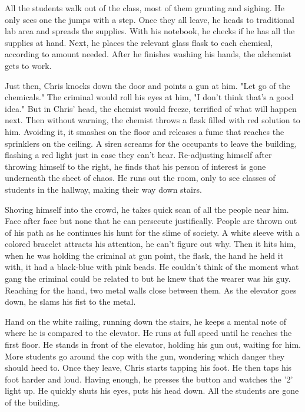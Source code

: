         All the students walk out of the class, most of them grunting and sighing. He only sees one the jumps with a step. Once they all leave,
    he heads to traditional lab area and spreads the supplies. With his notebook, he checks if he has all the supplies at hand. Next, he
    places the relevant glass flask to each chemical, according to amount needed. After he finishes washing his hands, the alchemist gets
    to work.

        Just then, Chris knocks down the door and points a gun at him. "Let go of the chemicals." The criminal would roll his eyes at him, "I 
    don't think that's a good idea." But in Chris' head, the chemist would freeze, terrified of what will happen next. Then without warning,
    the chemist throws a flask filled with red solution to him. Avoiding it, it smashes on the floor and releases a fume that reaches the
    sprinklers on the ceiling. A siren screams for the occupants to leave the building, flashing a red light just in case they can't hear. 
    Re-adjusting himself after throwing himself to the right, he finds that his person of interest is gone underneath the sheet of chaos. He
    runs out the room, only to see classes of students in the hallway, making their way down stairs.

        Shoving himself into the crowd, he takes quick scan of all the people near him. Face after face but none that he can persecute 
    justifically. People are thrown out of his path as he continues his hunt for the slime of society. A white sleeve with a colored bracelet
    attracts his attention, he can't figure out why. Then it hits him, when he was holding the criminal at gun point, the flask, the hand
    he held it with, it had a black-blue with pink beads. He couldn't think of the moment what gang the criminal could be related to but he
    knew that the wearer was his guy. Reaching for the hand, two metal walls close between them. As the elevator goes down, he slams his fist
    to the metal.

        Hand on the white railing, running down the stairs, he keeps a mental note of where he is compared to the elevator. He runs at full
    speed until he reaches the first floor. He stands in front of the elevator, holding his gun out, waiting for him. More students go around
    the cop with the gun, wondering which danger they should heed to. Once they leave, Chris starts tapping his foot. He then taps his foot
    harder and loud. Having enough, he presses the button and watches the '2' light up. He quickly shuts his eyes, puts his head down. All
    the students are gone of the building.

